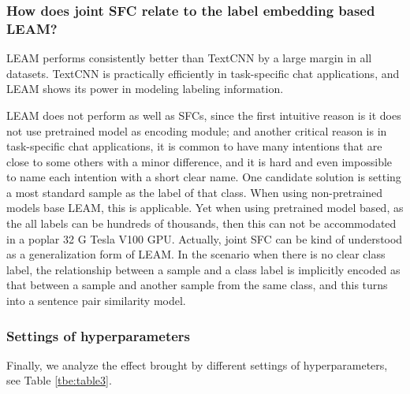\documentclass[letterpaper]{article} %
\begin{document}
  \subsubsection*{How does joint SFC relate to the label  embedding based  LEAM?}
  LEAM performs consistently better than TextCNN by a large margin in all
  datasets. TextCNN is practically efficiently in task-specific chat
  applications, and LEAM shows its power in modeling labeling information.

  LEAM  does not perform as well as SFCs, since the first intuitive reason is it
  does  not use pretrained model as encoding module; and another critical reason
  is  in  task-specific  chat applications, it is common to have many intentions
  that are close to some others with a minor difference, and it is hard and even
  impossible  to  name  each  intention  with  a short clear name. One candidate
  solution  is  setting  a most standard sample as the label of that class. When
  using  non-pretrained  models  base  LEAM,  this is applicable. Yet when using
  pretrained  model  based, as the all labels can be hundreds of thousands, then
  this  can not be accommodated in a poplar 32 G Tesla V100 GPU. Actually, joint
  SFC  can  be  kind  of  understood  as  a  generalization form of LEAM. In the
  scenario when there is no clear class label, the relationship between a sample
  and  a class label is implicitly encoded as that between a sample and another
  sample  from  the  same  class, and this turns into a sentence pair similarity
  model.

  \subsubsection*{Settings  of  hyperparameters} 
  Finally, we analyze the effect brought
  by  different  settings  of  hyperparameters,  see  Table \ref{tbe:table3}. 
\end{document}
